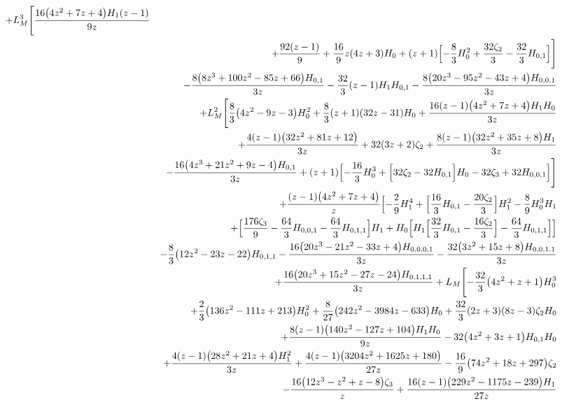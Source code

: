 \begin{eqnarray}
+L_M^3 \Biggl[\frac{16 \big(4 z^2+7 z+4\big) H_1  (z-1)}{9 z}
\nonumber\\&&
+\frac{92 (z-1)}{9}+\frac{16}{9} z (4 z+3) H_0
+(z+1) \Bigl[-\frac{8}{3} H_0^2+\frac{32 \zeta_2}{3}-\frac{32}{3}H_{0,1}\Bigr]\Biggr]
\nonumber\\&&
-\frac{8 \big(8 z^3+100 z^2-85 z+66\big) H_{0,1}}{3 z}
-\frac{32}{3} (z-1) H_1H_{0,1}
-\frac{8 \big(20 z^3-95 z^2-43 z+4\big) H_{0,0,1}}{3 z}
\nonumber\\&&
+L_M^2 \Biggl[\frac{8}{3} \big(4 z^2-9 z-3\big)H_0^2+\frac{8}{3} (z+1) (32 z-31) H_0
+\frac{16 (z-1) \big(4 z^2+7 z+4\big) H_1 H_0}{3 z}
\nonumber\\&&
+\frac{4 (z-1) \big(32  z^2+81 z+12\big)}{3 z}+32 (3 z+2) \zeta_2
+\frac{8 (z-1) \big(32 z^2+35 z+8\big) H_1}{3 z}
\nonumber\\&&
-\frac{16 \big(4 z^3+21 z^2+9  z-4\big) H_{0,1}}{3 z}
+(z+1) \Bigl[-\frac{16}{3} H_0^3+\Bigl[32 \zeta_2-32 H_{0,1}\Bigr] H_0-32 \zeta_3+32H_{0,0,1}\Bigr]\Biggr]
\nonumber\\&&
+\frac{(z-1) \big(4 z^2+7 z+4\big)}{z}
\Bigl[-\frac{2}{9} H_1^4+\Bigl[\frac{16}{3}  H_{0,1}-\frac{20 \zeta_2}{3}\Bigr] H_1^2-\frac{8}{9} H_0^3  H_1
\nonumber\\&&
+\Bigl[\frac{176 \zeta_3}{9}-\frac{64}{3} H_{0,0,1}-\frac{64}{3}  H_{0,1,1}\Bigr] H_1
+H_0 \Bigl[H_1 \Bigl[\frac{32}{3} H_{0,1}-\frac{16    \zeta_2}{3}\Bigr]-\frac{64}{3} H_{0,1,1}\Bigr]\Bigr]
\nonumber\\&&
-\frac{8}{3} \big(12 z^2-23 z-22\big) H_{0,1,1}-\frac{16 \big(20 z^3-21 z^2-33
  z+4\big) H_{0,0,0,1}}{3 z}-\frac{32 \big(3 z^2+15 z+8\big) H_{0,0,1,1}}{3 z}
\nonumber\\&&
+\frac{16 \big(20 z^3+15 z^2-27 z-24\big) H_{0,1,1,1}}{3 z}
+L_M \Biggl[-\frac{32}{3} \big(4 z^2+z+1\big)
H_0^3
\nonumber\\&&
+\frac{2}{3} \big(136 z^2-111 z+213\big) H_0^2
+\frac{8}{27} \big(242 z^2-3984 z-633\big) H_0
+\frac{32}{3} (2 z+3) (8 z-3) \zeta_2 H_0
\nonumber\\&&
+\frac{8 (z-1) \big(140 z^2-127 z+104\big) H_1 H_0}{9 z}
-32 \big(4 z^2+3 z+1\big) H_{0,1} H_0
\nonumber\\&&
+\frac{4 (z-1) \big(28 z^2+21 z+4\big)
  H_1^2}{3 z}
+\frac{4 (z-1) \big(3204 z^2+1625 z+180\big)}{27 z}
-\frac{16}{9} \big(74 z^2+18 z+297\big) \zeta_2
\nonumber \\ &&
-\frac{16 \big(12 z^3-z^2+z-8\big) \zeta_3}{z}
+\frac{16 (z-1) \big(229 z^2-1175
  z-239\big) H_1}{27 z}
\nonumber\\&&

\end{eqnarray}
